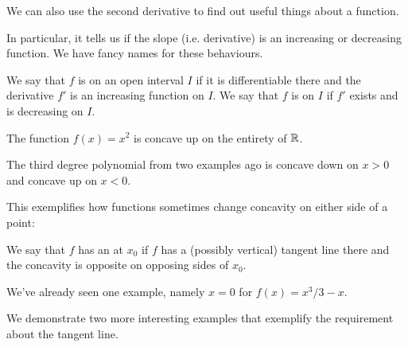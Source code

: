 
We can also use the second derivative to find out useful things about a function.

In particular, it tells us if the slope (i.e. derivative) is an increasing or decreasing function.
We have fancy names for these behaviours.

\begin{definition}[Concavity]
	We say that $f$ is  on an open interval $I$ if it is differentiable there and the derivative $f'$ is an increasing function on $I$.
	We say that $f$ is  on $I$ if $f'$ exists and is decreasing on $I$.
\end{definition}

\begin{example}
	The function $f(x) = x^2$ is concave up on the entirety of $\mathbb{R}$.
\end{example}

\begin{example}
	The third degree polynomial from two examples ago is concave down on $x > 0$ and concave up on $x < 0$.
\end{example}

\noindent
This exemplifies how functions sometimes change concavity on either side of a point:

\begin{definition}
	We say that $f$ has an  at $x_0$ if $f$ has a (possibly vertical) tangent line there and the concavity is opposite on opposing sides of $x_0$.
\end{definition}

\noindent
We've already seen one example, namely $x = 0$ for $f(x) = x^3 / 3 - x$.

We demonstrate two more interesting examples that exemplify the requirement about the tangent line.

